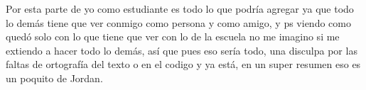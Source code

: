\documentclass[letterpaper, 12pt]{article}
\begin{document}
    Por esta parte de yo como estudiante es todo lo que podría agregar ya que todo lo demás tiene que ver conmigo como persona y como amigo, y ps viendo como quedó solo con lo que tiene que ver con lo de la escuela %
    no me imagino si me extiendo a hacer todo lo demás, así que pues eso sería todo, una disculpa por las faltas de ortografía del texto o en el codigo y ya está, en un super resumen eso es un poquito de Jordan.
    
    
\end{document}
